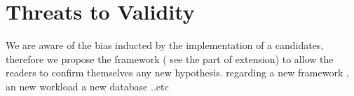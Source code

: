 



\section{Threats to Validity}
We are aware of the bias inducted by the implementation of a candidates, therefore we propose  the framework ( see the part of extension) to allow the readers to confirm themselves any new hypothesis. regarding a new framework , an new workload a new database ..etc

